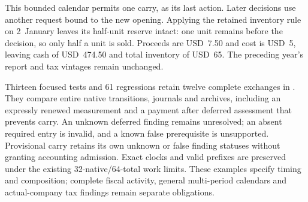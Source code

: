 This bounded calendar permits one carry, as its last action. Later decisions
use another request bound to the new opening. Applying the retained inventory
rule on 2~January leaves its half-unit reserve intact: one unit remains before
the decision, so only half a unit is sold. Proceeds are USD~7.50 and cost is
USD~5, leaving cash of USD~474.50 and total inventory of USD~65. The preceding
year's report and tax vintages remain unchanged.

Thirteen focused tests and 61 regressions retain twelve complete exchanges in
. They compare entire
native transitions, journals and archives, including an expressly renewed
measurement and a payment after deferred assessment that prevents carry.
An unknown deferred finding remains unresolved; an absent required entry is
invalid, and a known false prerequisite is unsupported. Provisional carry
retains its own unknown or false finding statuses without granting accounting
admission. Exact clocks and valid prefixes are preserved under the existing
32-native/64-total work limits. These examples specify timing and composition;
complete fiscal activity, general multi-period calendars and actual-company
tax findings remain separate obligations.
